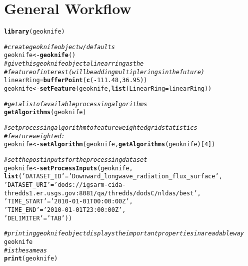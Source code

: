 \documentclass[a4paper,11pt]{article}\usepackage[]{graphicx}\usepackage[]{color}
\makeatletter
\newcommand{\hlnum}[1]{\textcolor[rgb]{0.686,0.059,0.569}{#1}}%
\newcommand{\hlstr}[1]{\textcolor[rgb]{0.192,0.494,0.8}{#1}}%
\newcommand{\hlcom}[1]{\textcolor[rgb]{0.678,0.584,0.686}{\textit{#1}}}%
\newcommand{\hlopt}[1]{\textcolor[rgb]{0,0,0}{#1}}%
\newcommand{\hlstd}[1]{\textcolor[rgb]{0.345,0.345,0.345}{#1}}%
\newcommand{\hlkwb}[1]{\textcolor[rgb]{0.69,0.353,0.396}{#1}}%
\newcommand{\hlkwc}[1]{\textcolor[rgb]{0.333,0.667,0.333}{#1}}%
\newcommand{\hlkwd}[1]{\textcolor[rgb]{0.737,0.353,0.396}{\textbf{#1}}}%
\newenvironment{kframe}{%
 \def\at@end@of@kframe{}%
 \ifinner\ifhmode%
  \def\at@end@of@kframe{\end{minipage}}%
  \begin{minipage}{\columnwidth}%
 \fi\fi%
 \def\FrameCommand##1{\hskip\@totalleftmargin \hskip-\fboxsep
 \colorbox{shadecolor}{##1}\hskip-\fboxsep
     \hskip-\linewidth \hskip-\@totalleftmargin \hskip\columnwidth}%
 \MakeFramed {\advance\hsize-\width
   \@totalleftmargin\z@ \linewidth\hsize
   \@setminipage}}%
 {\par\unskip\endMakeFramed%
 \at@end@of@kframe}
\newenvironment{knitrout}{}{} %
\makeatother
\begin{document}
\section{General Workflow}

\begin{knitrout}
\color{fgcolor}\begin{kframe}
\begin{alltt}
\hlkwd{library}\hlstd{(geoknife)}
\end{alltt}
\end{kframe}
\end{knitrout}

\begin{knitrout}
\color{fgcolor}\begin{kframe}
\begin{alltt}
\hlcom{# create geoknife object w/ defaults}
\hlstd{geoknife} \hlkwb{<-} \hlkwd{geoknife}\hlstd{()}
\hlcom{# give this geoknife object a linear ring as the }
\hlcom{# feature of interest (will be adding multiple rings in the future)}
\hlstd{linearRing} \hlkwb{=} \hlkwd{bufferPoint}\hlstd{(}\hlkwd{c}\hlstd{(}\hlopt{-}\hlnum{111.48}\hlstd{,}\hlnum{36.95}\hlstd{))}
\hlstd{geoknife} \hlkwb{<-} \hlkwd{setFeature}\hlstd{(geoknife,}\hlkwd{list}\hlstd{(}\hlkwc{LinearRing}\hlstd{=linearRing))}

\hlcom{# get a list of available processing algorithms}
\hlkwd{getAlgorithms}\hlstd{(geoknife)}

\hlcom{# set processing algorithm to feature weighted grid statistics}
\hlcom{# feature weighted:}
\hlstd{geoknife} \hlkwb{<-} \hlkwd{setAlgorithm}\hlstd{(geoknife,}\hlkwd{getAlgorithms}\hlstd{(geoknife)[}\hlnum{4}\hlstd{])}

\hlcom{# set the post inputs for the processing dataset}
\hlstd{geoknife} \hlkwb{<-} \hlkwd{setProcessInputs}\hlstd{(geoknife,}
   \hlkwd{list}\hlstd{(}\hlstr{'DATASET_ID'}\hlstd{=}\hlstr{'Downward_longwave_radiation_flux_surface'}\hlstd{,}
   \hlstr{'DATASET_URI'}\hlstd{=}\hlstr{'dods://igsarm-cida-thredds1.er.usgs.gov:8081/qa/thredds/dodsC/nldas/best'}\hlstd{,}
   \hlstr{'TIME_START'}\hlstd{=}\hlstr{'2010-01-01T00:00:00Z'}\hlstd{,}
   \hlstr{'TIME_END'}\hlstd{=}\hlstr{'2010-01-01T23:00:00Z'}\hlstd{,}
   \hlstr{'DELIMITER'}\hlstd{=}\hlstr{'TAB'}\hlstd{))}

\hlcom{# printing geoknife object displays the important properties in a readable way}
\hlstd{geoknife}
\hlcom{# is the same as }
\hlkwd{print}\hlstd{(geoknife)}


\end{alltt}
\end{kframe}
\end{knitrout}
\end{document}
